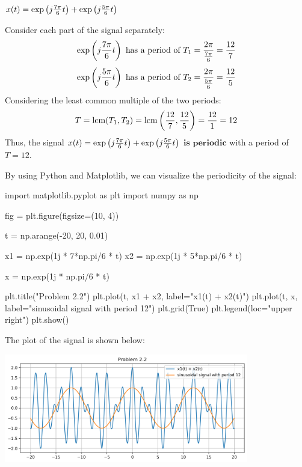 \documentclass[a4paper, 10pt]{article}
\begin{document}
\newpage

\begin{subproblems}[start=2]
    \item \( x(t) = \exp \left( j\frac{7\pi}{6}t \right) +  \exp \left( j\frac{5\pi}{6}t \right) \)
\end{subproblems}

\begin{solution}
Consider each part of the signal separately:
\[
\exp \left( j\frac{7\pi}{6}t \right) \text{ has a period of } T_1 = \frac{2\pi}{\frac{7\pi}{6}} = \frac{12}{7}
\]
\[
\exp \left( j\frac{5\pi}{6}t \right) \text{ has a period of } T_2 = \frac{2\pi}{\frac{5\pi}{6}} = \frac{12}{5}
\]
Considering the least common multiple of the two periods:
\[
T = \text{lcm}(T_1, T_2) = \text{lcm}\left(\frac{12}{7}, \frac{12}{5}\right) = \frac{12}{1} = 12
\]
Thus, the signal \( x(t) = \exp \left( j\frac{7\pi}{6}t \right) +  \exp \left( j\frac{5\pi}{6}t \right) \) \( \boxed{\textbf{is periodic}} \) with a period of \( \boxed{T = 12} \).

\vspace{5mm}

By using Python and Matplotlib, we can visualize the periodicity of the signal:
\begin{codingbox}
import matplotlib.pyplot as plt
import numpy as np

fig = plt.figure(figsize=(10, 4))

t = np.arange(-20, 20, 0.01)

x1 = np.exp(1j * 7*np.pi/6 * t)
x2 = np.exp(1j * 5*np.pi/6 * t)

x = np.exp(1j * np.pi/6 * t)

plt.title("Problem 2.2")
plt.plot(t, x1 + x2, label="x1(t) + x2(t)")
plt.plot(t, x, label="sinusoidal signal with period 12")
plt.grid(True)
plt.legend(loc="upper right")
plt.show()
\end{codingbox}
The plot of the signal is shown below:
\begin{center}
    \includegraphics[width=0.8\textwidth]{images/problem_2_2.png}
\end{center}
\end{solution}
\end{document}
